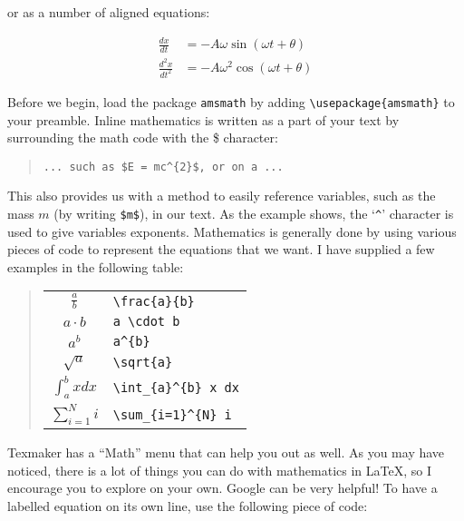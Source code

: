 \documentclass[a4paper,oneside]{memoir}
\begin{document}
or as a number of aligned equations:

\begin{align*}
\frac{dx}{dt} &= - A \omega \sin(\omega t + \theta) \\
\frac{d^2 x}{dt^2} &= - A \omega^2 \cos(\omega t + \theta)
\end{align*}

Before we begin, load the package \texttt{amsmath} by adding \lstinline$\usepackage{amsmath}$ to your preamble. Inline mathematics is written as a part of your text by surrounding the math code with the \$ character:

\begin{quote}
\begin{lstlisting}
... such as $E = mc^{2}$, or on a ...
\end{lstlisting}
\end{quote}

This also provides us with a method to easily reference variables, such as the mass $m$ (by writing \texttt{\$m\$}), in our text. As the example shows, the `\lstinline$^$' character is used to give variables exponents. Mathematics is generally done by using various pieces of code to represent the equations that we want. I have supplied a few examples in the following table:

\begin{quote}
\begin{tabular}{cl}
\toprule 
$\frac{a}{b}$ & \lstinline$\frac{a}{b}$ \vspace{2 mm} \\
$a \cdot b$ & \lstinline$a \cdot b$ \vspace{2 mm} \\   
$a^b$ & \lstinline$a^{b}$ \vspace{2 mm} \\ 
$\sqrt{a}$ & \lstinline$\sqrt{a}$ \vspace{2 mm} \\
$\displaystyle\int_a^b x dx$ & \lstinline$\int_{a}^{b} x dx$ \vspace{ 2mm} \\
$\displaystyle\sum_{i=1}^{N} i$ & \lstinline$\sum_{i=1}^{N} i$ \\
\bottomrule
\end{tabular} 
\end{quote}

Texmaker has a \enquote{Math} menu that can help you out as well. As you may have noticed, there is a lot of things you can do with mathematics in \LaTeX{}, so I encourage you to explore on your own. Google can be very helpful! To have a labelled equation on its own line, use the following piece of code:
\end{document}
